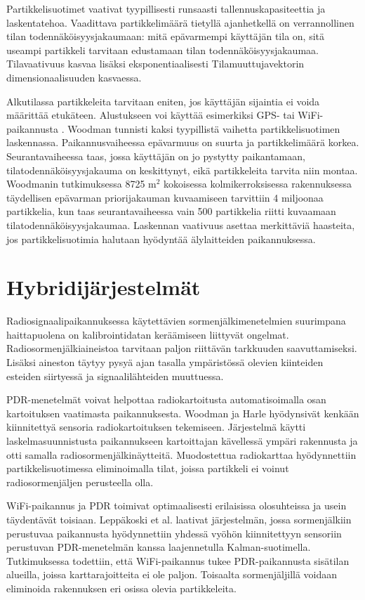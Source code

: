 Partikkelisuotimet vaativat tyypillisesti runsaasti tallennuskapasiteettia
ja laskentatehoa. Vaadittava partikkelimäärä tietyllä ajanhetkellä 
on verrannollinen
tilan todennäköisyysjakaumaan: mitä epävarmempi käyttäjän tila on, sitä
useampi partikkeli tarvitaan edustamaan tilan todennäköisyysjakaumaa.
Tilavaativuus kasvaa lisäksi eksponentiaalisesti
Tilamuuttujavektorin dimensionaalisuuden kasvaessa.

Alkutilassa partikkeleita tarvitaan eniten, jos käyttäjän sijaintia ei
voida määrittää etukäteen. Alustukseen voi käyttää esimerkiksi
GPS- tai WiFi-paikannusta \cite{woodman2009}. Woodman \cite{woodman2010}
tunnisti kaksi tyypillistä
vaihetta partikkelisuotimen laskennassa. Paikannusvaiheessa epävarmuus
on suurta ja partikkelimäärä korkea. Seurantavaiheessa taas, jossa käyttäjän
on jo pystytty paikantamaan, tilatodennäköisyysjakauma on keskittynyt, eikä
partikkeleita tarvita niin montaa. Woodmanin tutkimuksessa 8725
$\text{m}^2$ kokoisessa kolmikerroksisessa rakennuksessa täydellisen epävarman
priorijakauman kuvaamiseen tarvittiin 4 miljoonaa partikkelia, kun taas
seurantavaiheessa vain 500 partikkelia riitti kuvaamaan
tilatodennäköisyysjakaumaa. Laskennan vaativuus asettaa merkittäviä
haasteita, jos partikkelisuotimia halutaan hyödyntää älylaitteiden
paikannuksessa.

\section{Hybridijärjestelmät}

Radiosignaalipaikannuksessa käytettävien sormenjälkimenetelmien suurimpana
haittapuolena on kalibrointidatan keräämiseen liittyvät ongelmat.
Radiosormenjälkiaineistoa tarvitaan paljon riittävän tarkkuuden saavuttamiseksi.
Lisäksi aineston täytyy pysyä ajan tasalla
ympäristössä olevien kiinteiden esteiden siirtyessä ja signaalilähteiden
muuttuessa.

PDR-menetelmät voivat helpottaa radiokartoitusta automatisoimalla osan
kartoituksen vaatimasta paikannuksesta. Woodman ja Harle \cite{woodman2008}
hyödynsivät
kenkään kiinnitettyä sensoria radiokartoituksen tekemiseen. Järjestelmä
käytti laskelmasuunnistusta paikannukseen kartoittajan kävellessä
ympäri rakennusta ja otti samalla radiosormenjälkinäytteitä. 
Muodostettua radiokarttaa hyödynnettiin partikkelisuotimessa
eliminoimalla tilat, joissa partikkeli ei voinut radiosormenjäljen
perusteella olla.

WiFi-paikannus ja PDR toimivat optimaalisesti erilaisissa olosuhteissa
ja usein täydentävät toisiaan.
Leppäkoski et al. \cite{leppakoski2013} laativat
järjestelmän, jossa
sormenjälkiin perustuvaa paikannusta hyödynnettiin yhdessä 
vyöhön kiinnitettyyn sensoriin perustuvan PDR-menetelmän
kanssa laajennetulla Kalman-suotimella. Tutkimuksessa todettiin,
että WiFi-paikannus tukee PDR-paikannusta sisätilan alueilla, joissa
karttarajoitteita ei ole paljon. Toisaalta sormenjäljillä voidaan
eliminoida rakennuksen eri osissa olevia partikkeleita.

